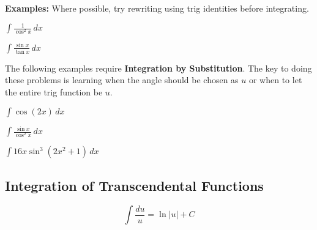 \documentclass[addpoints, 12pt]{exam}
\begin{document}
\noindent\textbf{Examples:} Where possible, try rewriting using trig identities before integrating.
\begin{questions}
    \question $\displaystyle\int\frac{1}{\cos^2 x}\,dx$
    
    \question $\displaystyle\int\frac{\sin x}{\tan x}\,dx$
    
    
    The following examples require \textbf{Integration by Substitution}. The key to doing these problems is learning when the angle should be chosen as $u$ or when to let the entire trig function be $u$.
    
    \begin{minipage}{0.45\linewidth}
        \question $\displaystyle\int\cos(2x)\,dx$    
    \end{minipage}
    \hfill
    \begin{minipage}{0.45\linewidth}
        \question $\displaystyle\int\frac{\sin x}{\cos^2 x}\,dx$
    \end{minipage}
    
    
    \question $\displaystyle\int 16x\sin^3\left(2x^2+1\right) \,dx$
\end{questions}


\newpage
{}
\subsection*{Integration of Transcendental Functions}
\begin{tcolorbox}[title= INTEGRAL OF \textit{U}^{-1},black,sharp corners,colback=white,colbacktitle=white,coltitle=black,boxrule=1pt]

    \[\displaystyle\int\frac{du}{u}=\ln|u|+C\]
    
\end{tcolorbox}
\end{document}
